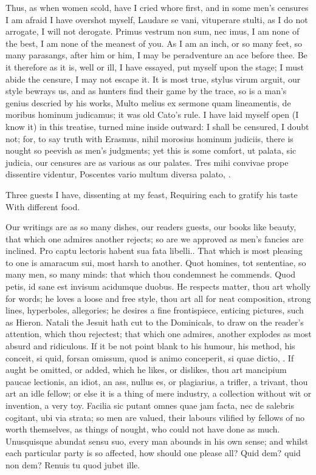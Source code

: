 {Thus, as when women scold, have I cried whore first, and in some men's
censures I am afraid I have overshot myself, Laudare se vani,
vituperare stulti, as I do not arrogate, I will not derogate. Primus
vestrum non sum, nec imus, I am none of the best, I am none of the
meanest of you. As I am an inch, or so many feet, so many parasangs,
after him or him, I may be peradventure an ace before thee. Be it
therefore as it is, well or ill, I have essayed, put myself upon the
stage; I must abide the censure, I may not escape it. It is most true,
stylus virum arguit, our style bewrays us, and as hunters find
their game by the trace, so is a man's genius descried by his works,
Multo melius ex sermone quam lineamentis, de moribus hominum judicamus;
it was old Cato's rule. I have laid myself open (I know it) in this
treatise, turned mine inside outward: I shall be censured, I doubt not;
for, to say truth with Erasmus, nihil morosius hominum judiciis, there
is nought so peevish as men's judgments; yet this is some comfort, ut
palata, sic judicia, our censures are as various as our palates.
Tres mihi convivae prope dissentire videntur,
Poscentes vario multum diversa palato, \etc.

Three guests I have, dissenting at my feast,
Requiring each to gratify his taste
With different food.

Our writings are as so many dishes, our readers guests, our books like
beauty, that which one admires another rejects; so are we approved as
men's fancies are inclined. Pro captu lectoris habent sua fata
libelli.. That which is most pleasing to one is amaracum sui, most
harsh to another. Quot homines, tot sententiae, so many men, so many
minds: that which thou condemnest he commends. Quod petis, id sane
est invisum acidumque duobus. He respects matter, thou art wholly for
words; he loves a loose and free style, thou art all for neat
composition, strong lines, hyperboles, allegories; he desires a fine
frontispiece, enticing pictures, such as Hieron. Natali the Jesuit
hath cut to the Dominicals, to draw on the reader's attention, which
thou rejectest; that which one admires, another explodes as most absurd
and ridiculous. If it be not point blank to his humour, his method, his
conceit, si quid, forsan omissum, quod is animo conceperit, si
quae dictio, \etc. If aught be omitted, or added, which he likes, or
dislikes, thou art mancipium paucae lectionis, an idiot, an ass, nullus
es, or plagiarius, a trifler, a trivant, thou art an idle fellow; or
else it is a thing of mere industry, a collection without wit or
invention, a very toy. Facilia sic putant omnes quae jam facta,
nec de salebris cogitant, ubi via strata; so men are valued, their
labours vilified by fellows of no worth themselves, as things of
nought, who could not have done as much. Unusquisque abundat sensu suo,
every man abounds in his own sense; and whilst each particular party is
so affected, how should one please all?
Quid dem? quid non dem? Renuis tu quod jubet ille.

}

